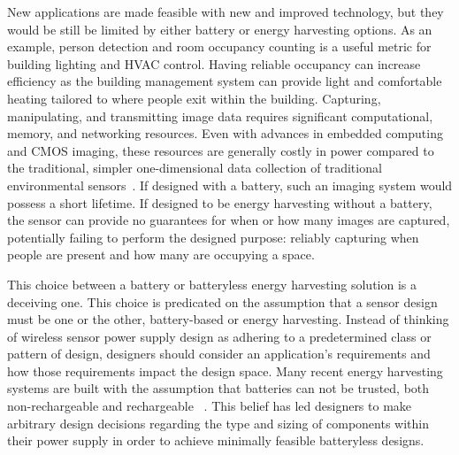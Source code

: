 New applications are made feasible with new and improved technology, but they would be still be limited by either battery or energy harvesting options.
As an example, person detection and room occupancy counting is a useful metric for building lighting and HVAC control.
Having reliable occupancy can increase efficiency as the building management system can provide light and comfortable heating tailored to where people exit within the building. 
Capturing, manipulating, and transmitting image data requires significant computational, memory, and networking resources. 
Even with advances in embedded computing and CMOS imaging, these resources are generally costly in power compared to the traditional, simpler one-dimensional data collection of traditional environmental sensors~\cite{mainwaring2002wireless}. 
If designed with a battery, such an imaging system would possess a short lifetime. If designed to be energy harvesting without a battery, the sensor can provide no guarantees for when or how many images are captured, potentially failing to perform the designed purpose: reliably capturing when people are present and how many are occupying a space. 

This choice between a battery or batteryless energy harvesting solution is a deceiving one.
This choice is predicated on the assumption that a sensor design must be one or the other, battery-based or energy harvesting.
Instead of thinking of wireless sensor power supply design as adhering to a predetermined class or pattern of design, designers should consider an application's requirements and how those requirements impact the design space.
Many recent energy harvesting systems are built with the assumption that batteries can not be trusted, both non-rechargeable and rechargeable
~\cite{hesterNew17, hesterTragedy15, hesterFlicker17, hesterTimely17, hester2017future, colinReconfigurable18, luciaIntermittent17, yervaGrafting12, majid2020continuous}.
This belief has led designers to make arbitrary design decisions regarding the type and sizing of components within their power supply in order to achieve minimally feasible batteryless designs.

